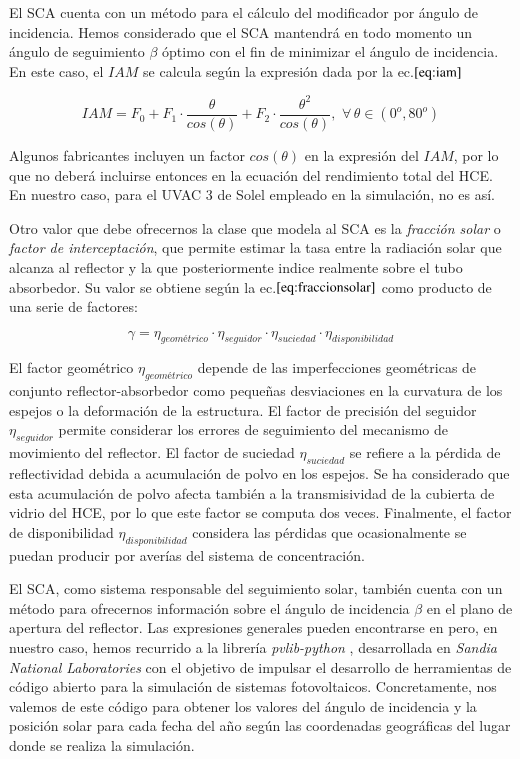 El SCA cuenta con un método para el cálculo del modificador por ángulo de incidencia. Hemos considerado que el SCA mantendrá en todo momento un ángulo de seguimiento \(\beta\) óptimo con el fin de minimizar el ángulo de incidencia. En este caso, el \(IAM\) se calcula según la expresión dada por la ec.\(\eqref{eq:iam}\)

\begin{equation}
   IAM = F_0 + F_1 \cdot \frac{\theta}{cos(\theta)} + F_2 \cdot \frac{\theta^2}{cos(\theta)},\,\, \forall  \,
 \theta \in (0^o, 80^o)
    \label{eq:iam}
\end{equation}

Algunos fabricantes incluyen un factor \(cos(\theta)\) en la expresión del \(IAM\), por lo que no deberá incluirse entonces en la ecuación del rendimiento total del HCE. En nuestro caso, para el UVAC 3 de Solel empleado en la simulación, no es así.

Otro valor que debe ofrecernos la clase que modela al SCA es la \textit{fracción solar} o \textit{factor de interceptación}, que permite estimar la tasa entre la radiación solar que alcanza al reflector y la que posteriormente indice realmente sobre el tubo absorbedor. Su valor se obtiene según la ec.\(\eqref{eq:fraccionsolar}\) como producto de una serie de factores: 

\begin{equation}
   \gamma = \eta_{geométrico} \cdot \eta_{seguidor} \cdot \eta_{suciedad} \cdot \eta_{disponibilidad}
    \label{eq:fraccionsolar}
\end{equation}

El factor geométrico \(\eta_{geométrico}\) depende de las imperfecciones geométricas de conjunto reflector-absorbedor como pequeñas desviaciones en la curvatura de los espejos o la deformación de la estructura. El factor de precisión del seguidor \(\eta_{seguidor}\) permite considerar los errores de seguimiento del mecanismo de movimiento del reflector. El factor de suciedad \(\eta_{suciedad}\) se refiere a la pérdida de reflectividad debida a acumulación de polvo en los espejos. Se ha considerado que esta acumulación de polvo afecta también a la transmisividad de la cubierta de vidrio del HCE, por lo que este factor se computa dos veces. Finalmente, el factor de disponibilidad \(\eta_{disponibilidad}\) considera las pérdidas que ocasionalmente se puedan producir por averías del sistema de concentración.

El SCA, como sistema responsable del seguimiento solar, también cuenta con un método para ofrecernos información sobre el ángulo de incidencia \(\beta\) en el plano de apertura del reflector. Las expresiones generales pueden encontrarse en \cite{duffieSolarEngineeringThermal2006} pero, en nuestro caso, hemos recurrido a la librería \emph{pvlib-python}  \cite{holmgrenPvlibPythonPython2018}, desarrollada en \emph{Sandia National Laboratories} con el objetivo de impulsar el desarrollo de herramientas de código abierto para la simulación de sistemas fotovoltaicos. Concretamente, nos valemos de este código para obtener los valores del ángulo de incidencia y la posición solar para cada fecha del año según las coordenadas geográficas del lugar donde se realiza la simulación.

